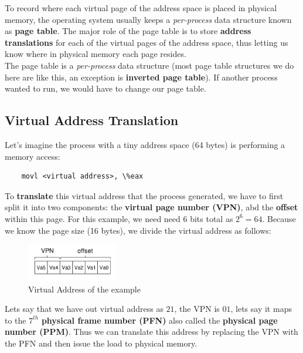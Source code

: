 To record where each virtual page of the address space is placed in physical 
memory, the operating system usually keeps a \textit{per-process} data 
structure known as \textbf{page table}. The major role of the page table is
to store \textbf{address translations} for each of the virtual pages of the
address space, thus letting us know where in physical memory each page
resides.\\

The page table is a \textit{per-process} data structure (most page table
structures we do here are like this, an exception is \textbf{inverted page
table}). If another process wanted to run, we would have to change our page
table.\\

\subsection{Virtual Address Translation}

Let's imagine the process with a tiny address space (64 bytes) is performing
a memory access:

\begin{lstlisting}
    movl <virtual address>, \%eax
\end{lstlisting}

To \textbf{translate} this virtual address that the process generated, we have
to first split it into two components: the \textbf{virtual page number (VPN)},
abd the \textbf{offset} within this page. For this example, we need need 6 bits
total as $2^6 = 64$. Because we know the page size (16 bytes), we divide the
virtual address as follows:

\begin{figure}[h!]
    \begin{center}
        \includegraphics[width=4cm]{img/vapage.png}
        \caption{Virtual Address of the example}
    \end{center}
\end{figure}

Lets say that we have out virtual address as $21$, the VPN is $01$,
lets say it maps to the
$7^{th}$ \textbf{physical frame number (PFN)} also called the \textbf{physical
page number (PPM)}. Thus we can translate this address by replacing the VPN
with the PFN and then issue the load to physical memory.

